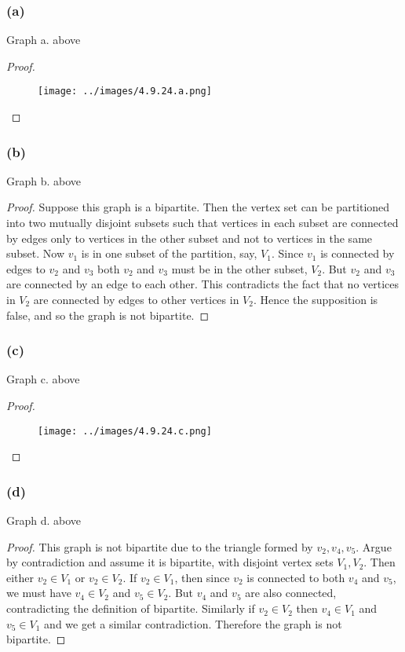 \documentclass[14pt]{extarticle}
\begin{document}
\subsubsection{(a)}
Graph a. above

\begin{proof}
    \begin{figure}[ht!]
        \centering
        \texttt{[image: ../images/4.9.24.a.png]}
    \end{figure}
\end{proof}

\subsubsection{(b)}
Graph b. above

\begin{proof}
    Suppose this graph is a bipartite. Then the vertex set can be partitioned into two mutually disjoint subsets such that vertices in each subset are connected by edges only to vertices in the other subset and not to vertices in the same subset. Now $v_1$ is in one subset of the partition, say, $V_1$. Since $v_1$ is connected by edges to $v_2$ and $v_3$ both $v_2$ and $v_3$ must be in the other subset, $V_2$. But $v_2$ and $v_3$ are connected by an edge to each other. This contradicts the fact that no vertices in $V_2$ are connected by edges to other vertices in $V_2$. Hence the supposition is false, and so the graph is not bipartite.
\end{proof}

\subsubsection{(c)}
Graph c. above

\begin{proof}
    \begin{figure}[ht!]
        \centering
        \texttt{[image: ../images/4.9.24.c.png]}
    \end{figure}
\end{proof}

\subsubsection{(d)}
Graph d. above

\begin{proof}
    This graph is not bipartite due to the triangle formed by $v_2, v_4, v_5$. Argue by contradiction and assume it is bipartite, with disjoint vertex sets $V_1, V_2$. Then either $v_2 \in V_1$ or $v_2 \in V_2$. If $v_2 \in V_1$, then since $v_2$ is connected to both $v_4$ and $v_5$, we must have $v_4 \in V_2$ and $v_5 \in V_2$. But $v_4$ and $v_5$ are also connected, contradicting the definition of bipartite. Similarly if $v_2 \in V_2$ then $v_4 \in V_1$ and $v_5 \in V_1$ and we get a similar contradiction. Therefore the graph is not bipartite.
\end{proof}
\end{document}
